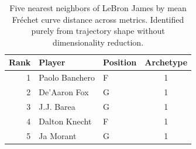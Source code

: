 \begin{table}[htbp]
  \centering\small
  \begin{tabular}{rllc}
    \toprule
    Rank & Player & Position & Archetype \\
    \midrule
    1 & Paolo Banchero & F & 1 \\
    2 & De'Aaron Fox & G & 1 \\
    3 & J.J. Barea & G & 1 \\
    4 & Dalton Knecht & F & 1 \\
    5 & Ja Morant & G & 1 \\
    \bottomrule
  \end{tabular}
  \caption{Five nearest neighbors of LeBron James by mean Fr\'{e}chet curve distance across metrics. Identified purely from trajectory shape without dimensionality reduction.}
  \label{tab:LeBron_James_frechet_curve_neighbors}
\end{table}

